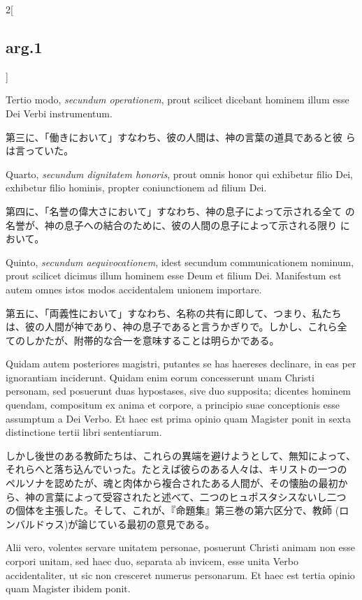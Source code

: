 \documentclass[paper=a4paper,fontsize=10pt,jafontsize=9pt,titlepage]{jlreq}
\begin{document}
\begin{paracol}{2}[\subsection{arg.1}]
\switchcolumn*

Tertio modo, {\itshape secundum operationem}, prout scilicet dicebant
hominem illum esse Dei Verbi instrumentum.

\switchcolumn

第三に、「働きにおいて」すなわち、彼の人間は、神の言葉の道具であると彼
らは言っていた。

\switchcolumn*

Quarto, {\itshape secundum dignitatem honoris}, prout omnis honor qui
exhibetur filio Dei, exhibetur filio hominis, propter coniunctionem ad
filium Dei.

\switchcolumn

第四に、「名誉の偉大さにおいて」すなわち、神の息子によって示される全て
の名誉が、神の息子への結合のために、彼の人間の息子によって示される限り
において。

\switchcolumn*

Quinto, {\itshape secundum aequivocationem}, idest secundum
communicationem nominum, prout scilicet dicimus illum hominem esse
Deum et filium Dei. Manifestum est autem omnes istos modos
accidentalem unionem importare.

\switchcolumn

第五に、「両義性において」すなわち、名称の共有に即して、つまり、私たち
は、彼の人間が神であり、神の息子であると言うかぎりで。しかし、これら全
てのしかたが、附帯的な合一を意味することは明らかである。

\switchcolumn*

Quidam autem posteriores magistri, putantes se has haereses declinare,
in eas per ignorantiam inciderunt. Quidam enim eorum concesserunt unam
Christi personam, sed posuerunt duas hypostases, sive duo supposita;
dicentes hominem quendam, compositum ex anima et corpore, a principio
suae conceptionis esse assumptum a Dei Verbo.  Et haec est prima
opinio quam Magister ponit in sexta distinctione tertii libri
sententiarum.

\switchcolumn

しかし後世のある教師たちは、これらの異端を避けようとして、無知によって、
それらへと落ち込んでいった。たとえば彼らのある人々は、キリストの一つの
ペルソナを認めたが、魂と肉体から複合されたある人間が、その懐胎の最初か
ら、神の言葉によって受容されたと述べて、二つのヒュポスタシスないし二つ
の個体を主張した。そして、これが、『命題集』第三巻の第六区分で、教師
(ロンバルドゥス)が論じている最初の意見である。

\switchcolumn*

Alii vero, volentes servare unitatem personae, posuerunt Christi
animam non esse corpori unitam, sed haec duo, separata ab invicem,
esse unita Verbo accidentaliter, ut sic non cresceret numerus
personarum. Et haec est tertia opinio quam Magister ibidem ponit.


\end{paracol}
\end{document}
